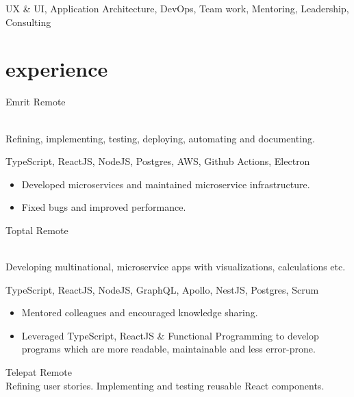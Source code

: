 \documentclass[]{cv-style}          %
\begin{document}
UX \& UI, Application Architecture, DevOps, Team work, Mentoring, Leadership, Consulting


\section{experience}

\begin{entrylist}
  \entry
  {}
  {Emrit}
  {Remote}
  {\\
    Refining, implementing, testing, deploying, automating and documenting.\\
    \subtitle{Tech Stack:} TypeScript, ReactJS, NodeJS, Postgres, AWS, Github Actions, Electron\\
    \subtitle{Detailed achievements:}
    \begin{itemize}
      \item Developed microservices and maintained microservice infrastructure.
      \item Fixed bugs and improved performance.
    \end{itemize}}
  \entry
  {}
  {Toptal}
  {Remote}
  {\\
    Developing multinational, microservice apps with visualizations, calculations etc.\\
    \subtitle{Tech Stack:} TypeScript, ReactJS, NodeJS, GraphQL, Apollo, NestJS, Postgres, Scrum\\
    \subtitle{Detailed achievements:}
    \begin{itemize}
      \item Mentored colleagues and encouraged knowledge sharing.
      \item Leveraged TypeScript, ReactJS \& Functional Programming to develop programs which are more readable, maintainable and less error-prone.
    \end{itemize}}
  \entry
  {}
  {Telepat}
  {Remote}
  {\\
    Refining user stories. Implementing and testing reusable React components.\\
}
\end{entrylist}
\end{document}
